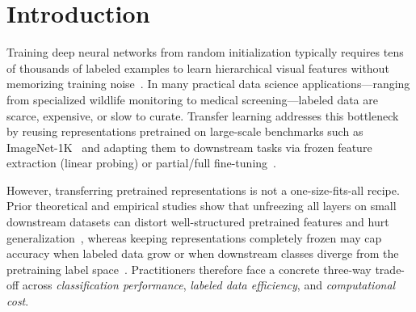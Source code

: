 \documentclass[sigconf,nonacm]{acmart}
\begin{document}
\maketitle

\section{Introduction}
Training deep neural networks from random initialization typically requires tens of thousands of labeled examples to learn hierarchical visual features without memorizing training noise~\cite{deng2009imagenet,he2016deep}. In many practical data science applications---ranging from specialized wildlife monitoring to medical screening---labeled data are scarce, expensive, or slow to curate. Transfer learning addresses this bottleneck by reusing representations pretrained on large-scale benchmarks such as ImageNet-1K~\cite{russakovsky2015imagenet} and adapting them to downstream tasks via frozen feature extraction (linear probing) or partial/full fine-tuning~\cite{yosinski2014transferable,kornblith2019better}.

However, transferring pretrained representations is not a one-size-fits-all recipe. Prior theoretical and empirical studies show that unfreezing all layers on small downstream datasets can distort well-structured pretrained features and hurt generalization~\cite{kumar2022finetuning}, whereas keeping representations completely frozen may cap accuracy when labeled data grow or when downstream classes diverge from the pretraining label space~\cite{raghu2019transfusion}. Practitioners therefore face a concrete three-way trade-off across \emph{classification performance}, \emph{labeled data efficiency}, and \emph{computational cost}.
\end{document}

